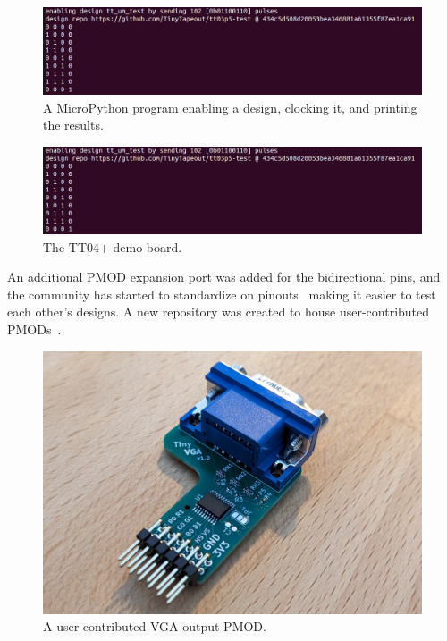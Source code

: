 \begin{figure}[htp]
\centering
\includegraphics[width=\columnwidth]{./Figs/tt3p5 enable design.png}
\caption{A MicroPython program enabling a design, clocking it, and printing the results.}
\label{fig:micropython_program}
\end{figure}

\begin{figure}[htp]
\centering
\includegraphics[width=\columnwidth]{./Figs/tt3p5 enable design.png}
\caption{The TT04+ demo board.}
\label{fig:TT04plus_demo_board}
\end{figure}

An additional PMOD expansion port was added for the bidirectional pins, and the community has started to standardize on pinouts~\cite{pinouts} making it easier to test each other's designs.
A new repository was created to house user-contributed PMODs~\cite{awesomepmods}.

\begin{figure}[htp]
\centering
\includegraphics[width=\columnwidth]{./Figs/tiny_vga_pmod.jpg}
\caption{A user-contributed VGA output PMOD.}
\label{fig:user_contributed_VGA_PMOD}
\end{figure}

